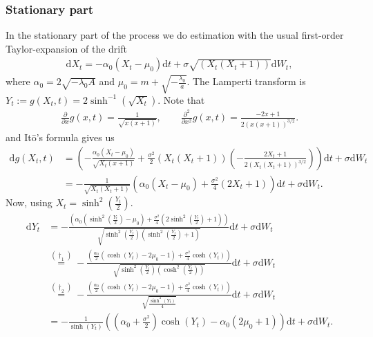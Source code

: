 \subsubsection{Stationary part}
In the stationary part of the process we do estimation with the usual first-order Taylor-expansion of the drift
\begin{align}
    \mathrm{d}X_t = -\alpha_0\left(X_t - \mu_0\right)\mathrm{d}t + \sigma \sqrt{\left(X_t\left(X_t + 1\right)\right)}\mathrm{d}W_t,
\end{align}
where $\alpha_0 = 2\sqrt{-\lambda_0 A}$ and $\mu_0 = m + \sqrt{-\frac{\lambda_0}{a}}$.
The Lamperti transform is $Y_t := g(X_t, t) = 2 \sinh^{-1}\left(\sqrt{X_t}\right)$. Note that
\begin{align}
    \frac{\partial}{\partial x}g(x, t) = \frac{1}{\sqrt{x\left(x + 1\right)}}, \qquad \frac{\partial^2}{\partial x^2}g(x, t) = \frac{-2x + 1}{2\left(x\left(x + 1\right)\right)^{3/2}}.
\end{align}
and Itō's formula gives us
\begin{align}
    \mathrm{d}g(X_t, t) &= \left(-\frac{\alpha_0\left(X_t - \mu_0\right)}{\sqrt{X_t\left(x + 1\right)}} + \frac{\sigma^2}{2}\left(X_t\left(X_t + 1\right)\right)\left(-\frac{2X_t + 1}{2\left(X_t\left(X_t + 1\right)\right)^{3/2}}\right)\right)\mathrm{d}t + \sigma\mathrm{d}W_t \nonumber\\
    &= -\frac{1}{\sqrt{X_t\left(X_t + 1\right)}}\left(\alpha_0\left(X_t - \mu_0\right) + \frac{\sigma^2}{4}\left(2X_t + 1\right)\right)\mathrm{d}t + \sigma\mathrm{d}W_t.
\end{align}
Now, using $X_t = \sinh^2\left(\frac{Y_t}{2}\right)$.
\begin{align}
    \mathrm{d}Y_t &=  -\frac{\left(\alpha_0\left(\sinh^2\left(\frac{Y_t}{2}\right) - \mu_0\right) + \frac{\sigma^2}{4}\left(2\sinh^2\left(\frac{Y_t}{2}\right) + 1\right)\right)}{\sqrt{\sinh^2\left(\frac{Y_t}{2}\right)\left(\sinh^2\left(\frac{Y_t}{2}\right) + 1\right)}}\mathrm{d}t  + \sigma\mathrm{d}W_t \nonumber \\
     &\overset{\left(\dagger_1\right)}{=} -\frac{\left(\frac{\alpha_0}{2}\left(\cosh(Y_t) - 2\mu_0 - 1\right)+\frac{\sigma^2}{4}\cosh(Y_t)\right)}{\sqrt{\sinh^2\left(\frac{Y_t}{2}\right)\left(\cosh^2\left(\frac{Y_t}{2}\right)\right)}}\mathrm{d}t  + \sigma\mathrm{d}W_t \nonumber \\
     &\overset{(\dagger_2)}{=} -\frac{\left(\frac{\alpha_0}{2}\left(\cosh(Y_t) - 2\mu_0 - 1\right)+\frac{\sigma^2}{4}\cosh(Y_t)\right)}{\sqrt{\frac{\sinh^2(Y_t)}{4}}}\mathrm{d}t  + \sigma\mathrm{d}W_t \nonumber \\
     &= - \frac{1}{\sinh(Y_t)}\left(\left(\alpha_0 + \frac{\sigma^2}{2}\right)\cosh(Y_t) - \alpha_0\left(2\mu_0 + 1\right)\right) \mathrm{d}t + \sigma \mathrm{d}W_t. \label{eq:F_diffusion_lamperti_SDE}
\end{align}
